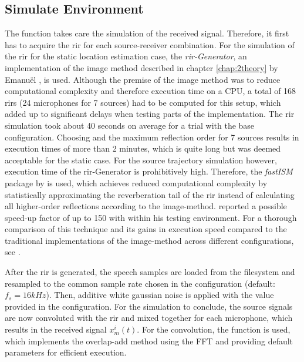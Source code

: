 \subsection{Simulate Environment}
The  function takes care the simulation of the received signal. Therefore, it first has to acquire the \gls{rir} for each source-receiver combination. For the simulation of the \gls{rir} for the static location estimation case, the \emph{\gls{rir}-Generator}, an implementation of the image method described in chapter \ref{chap:2theory} by Emanuël \citet*{Habets2014}, is used. Although the premise of the image method was to reduce computational complexity and therefore execution time on a CPU, a total of 168 \glspl{rir} (24 microphones for 7 sources) had to be computed for this setup, which added up to significant delays when testing parts of the implementation. The \gls{rir} simulation took about 40 seconds on average for a trial with the base configuration. Choosing  and the maximum reflection order for 7 sources results in execution times of more than 2 minutes, which is quite long but was deemed acceptable for the static case. For the source trajectory simulation however, execution time of the \gls{rir}-Generator is prohibitively high. Therefore, the \emph{fastISM} package by \citeauthor{Lehmann2010} is used, which achieves reduced computational complexity by statistically approximating the reverberation tail of the \gls{rir} instead of calculating all higher-order reflections according to the image-method. \citeauthor{Lehmann2010} reported a possible speed-up factor of up to 150 with  within his testing environment. For a thorough comparison of this technique and its gains in execution speed compared to the traditional implementations of the image-method across different configurations, see \cite{Lehmann2010}.

After the \gls{rir} is generated, the speech samples are loaded from the filesystem and resampled to the common sample rate chosen in the configuration (default: $f_s=16kHz$). Then, additive white gaussian noise is applied with the  value provided in the configuration. For the simulation to conclude, the source signals are now convoluted with the \gls{rir} and mixed together for each microphone, which results in the received signal $x_m^i(t)$. For the convolution, the \matlab function  is used, which implements the overlap-add method using the FFT and providing default parameters for efficient execution.

